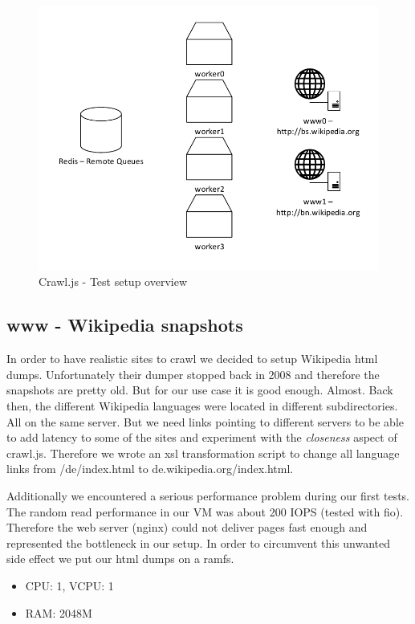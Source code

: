 \begin{figure}[h]
\centering
  \includegraphics[width=1.0\textwidth]{Figures/experiments_setup.pdf}
\caption{Crawl.js - Test setup overview}
\label{test_setup}
\end{figure}

\subsection{www - Wikipedia snapshots}
In order to have realistic sites to crawl we decided to setup Wikipedia html dumps. Unfortunately their dumper stopped back in 2008 and therefore the snapshots are pretty old. But for our use case it is good enough. Almost. Back then, the different Wikipedia languages were located in different subdirectories. All on the same server. But we need links pointing to different servers to be able to add latency to some of the sites and experiment with the \emph{closeness} aspect of crawl.js. Therefore we wrote an xsl transformation script to change all language links from /de/index.html to de.wikipedia.org/index.html.


Additionally we encountered a serious performance problem during our first tests. The random read performance in our VM was about 200 IOPS (tested with fio). Therefore the web server (nginx) could not deliver pages fast enough and represented the bottleneck in our setup. In order to circumvent this unwanted side effect we put our html dumps on a ramfs.

\begin{itemize}
  \item CPU: 1, VCPU: 1
  \item RAM: 2048M
\end{itemize}

